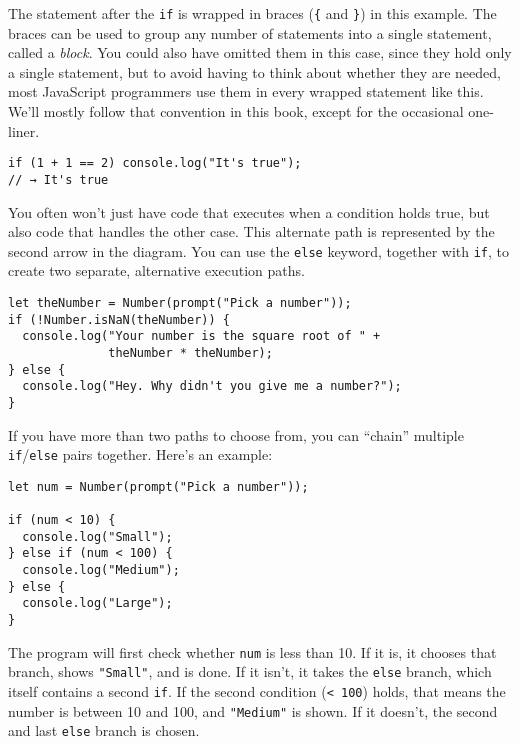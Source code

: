 The statement after the \lstinline`if` is wrapped in braces (\lstinline`{` and \lstinline`}`) in this example. The braces can be used to group any number of statements into a single statement, called a \emph{block}. You could also have omitted them in this case, since they hold only a single statement, but to avoid having to think about whether they are needed, most JavaScript programmers use them in every wrapped statement like this. We'll mostly follow that convention in this book, except for the occasional one-liner.

\begin{lstlisting}
if (1 + 1 == 2) console.log("It's true");
// → It's true
\end{lstlisting}
\noindent{}

You often won't just have code that executes when a condition holds true, but also code that handles the other case. This alternate path is represented by the second arrow in the diagram. You can use the \lstinline`else` keyword, together with \lstinline`if`, to create two separate, alternative execution paths.

\begin{lstlisting}
let theNumber = Number(prompt("Pick a number"));
if (!Number.isNaN(theNumber)) {
  console.log("Your number is the square root of " +
              theNumber * theNumber);
} else {
  console.log("Hey. Why didn't you give me a number?");
}
\end{lstlisting}
\noindent{}

If you have more than two paths to choose from, you can ``chain'' multiple \lstinline`if`/\lstinline`else` pairs together. Here's an example:

\begin{lstlisting}
let num = Number(prompt("Pick a number"));

if (num < 10) {
  console.log("Small");
} else if (num < 100) {
  console.log("Medium");
} else {
  console.log("Large");
}
\end{lstlisting}
\noindent

The program will first check whether \lstinline`num` is less than 10. If it is, it chooses that branch, shows \lstinline`"Small"`, and is done. If it isn't, it takes the \lstinline`else` branch, which itself contains a second \lstinline`if`. If the second condition (\lstinline`< 100`) holds, that means the number is between 10 and 100, and \lstinline`"Medium"` is shown. If it doesn't, the second and last \lstinline`else` branch is chosen.

